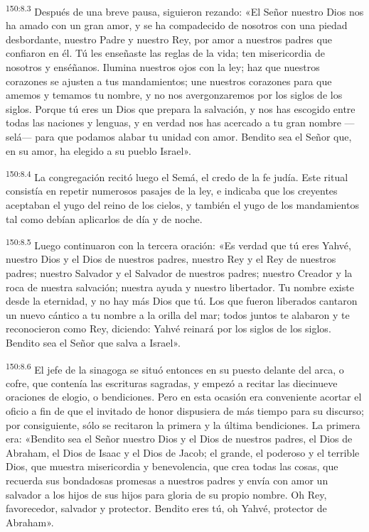 \par
\textsuperscript{150:8.3} Después de una breve pausa, siguieron rezando: «El Señor nuestro Dios nos ha amado con un gran amor, y se ha compadecido de nosotros con una piedad desbordante, nuestro Padre y nuestro Rey, por amor a nuestros padres que confiaron en él. Tú les enseñaste las reglas de la vida; ten misericordia de nosotros y enséñanos. Ilumina nuestros ojos con la ley; haz que nuestros corazones se ajusten a tus mandamientos; une nuestros corazones para que amemos y temamos tu nombre, y no nos avergonzaremos por los siglos de los siglos. Porque tú eres un Dios que prepara la salvación, y nos has escogido entre todas las naciones y lenguas, y en verdad nos has acercado a tu gran nombre ---selá--- para que podamos alabar tu unidad con amor. Bendito sea el Señor que, en su amor, ha elegido a su pueblo Israel».

\par
\textsuperscript{150:8.4} La congregación recitó luego el Semá, el credo de la fe judía. Este ritual consistía en repetir numerosos pasajes de la ley, e indicaba que los creyentes aceptaban el yugo del reino de los cielos, y también el yugo de los mandamientos tal como debían aplicarlos de día y de noche.

\par
\textsuperscript{150:8.5} Luego continuaron con la tercera oración: «Es verdad que tú eres Yahvé, nuestro Dios y el Dios de nuestros padres, nuestro Rey y el Rey de nuestros padres; nuestro Salvador y el Salvador de nuestros padres; nuestro Creador y la roca de nuestra salvación; nuestra ayuda y nuestro libertador. Tu nombre existe desde la eternidad, y no hay más Dios que tú. Los que fueron liberados cantaron un nuevo cántico a tu nombre a la orilla del mar; todos juntos te alabaron y te reconocieron como Rey, diciendo: Yahvé reinará por los siglos de los siglos. Bendito sea el Señor que salva a Israel».

\par
\textsuperscript{150:8.6} El jefe de la sinagoga se situó entonces en su puesto delante del arca, o cofre, que contenía las escrituras sagradas, y empezó a recitar las diecinueve oraciones de elogio, o bendiciones. Pero en esta ocasión era conveniente acortar el oficio a fin de que el invitado de honor dispusiera de más tiempo para su discurso; por consiguiente, sólo se recitaron la primera y la última bendiciones. La primera era: «Bendito sea el Señor nuestro Dios y el Dios de nuestros padres, el Dios de Abraham, el Dios de Isaac y el Dios de Jacob; el grande, el poderoso y el terrible Dios, que muestra misericordia y benevolencia, que crea todas las cosas, que recuerda sus bondadosas promesas a nuestros padres y envía con amor un salvador a los hijos de sus hijos para gloria de su propio nombre. Oh Rey, favorecedor, salvador y protector. Bendito eres tú, oh Yahvé, protector de Abraham».

